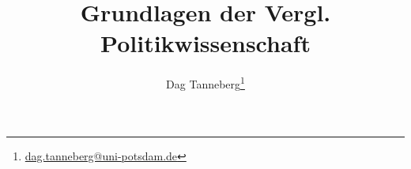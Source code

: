 \usepackage[ngerman]{babel}
\usepackage{booktabs}
\usepackage{graphicx}
\usepackage{hyperref}
\usepackage{multirow}
\usepackage{adjustbox}
\usepackage{tikz}
    \usetikzlibrary{positioning}

\title{Grundlagen der Vergl. Politikwissenschaft}
\author{Dag Tanneberg\thanks{%
  \href{mailto:dag.tanneberg@uni-potsdam.de}%
    {dag.tanneberg@uni-potsdam.de}
  }
}
\hypersetup{colorlinks, urlcolor = red, linkcolor = }

\newcommand*{\priority}[1]{\begin{tikzpicture}[scale=0.15]%
    \draw (0,0) circle (1);
    \fill[fill opacity=.4, fill=black] (0,0) -- (90:1) arc (90:90-#1*3.6:1) -- cycle;
    \end{tikzpicture}}